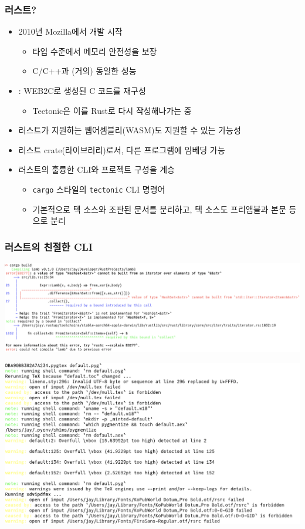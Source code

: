 \begin{frame}[c]
  \frametitle{러스트?}

  \begin{itemize}
    \item<1-> 2010년 Mozilla에서 개발 시작
    \begin{itemize}
      \item 타입 수준에서 메모리 안전성을 보장
      \item C/C++과 (거의) 동일한 성능
    \end{itemize}

    \item<2-> \XeTeX: WEB2C로 생성된 C 코드를 재구성
      \begin{itemize}
        \item Tectonic은 이를 Rust로 다시 작성해나가는 중
      \end{itemize}

    \item<2-> 러스트가 지원하는 웹어셈블리(WASM)도 지원할 수 있는 가능성

    \item<3-> 러스트 crate(라이브러리)로서, 다른 프로그램에 임베딩 가능

    \item<3-> 러스트의 훌륭한 CLI와 프로젝트 구성을 계승
      \begin{itemize}
        \item \texttt{cargo} 스타일의 \texttt{tectonic} CLI 명령어
        \item 기본적으로 텍 소스와 조판된 문서를 분리하고, 텍 소스도 프리앰블과 본문 등으로 분리
      \end{itemize}
  \end{itemize}
\end{frame}

\begin{frame}[c]
  \frametitle{러스트의 친절한 CLI}

  \centering
  \includegraphics[width=0.8\linewidth]{cargo-cli.png}

  \includegraphics[width=0.8\linewidth]{tectonic-cli.png}
\end{frame}

